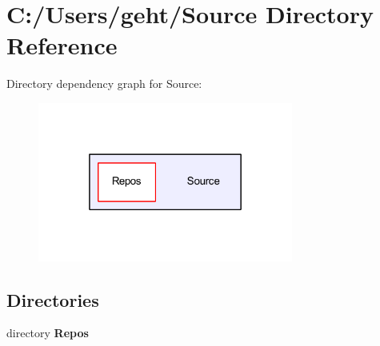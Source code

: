 \section{C\-:/\-Users/geht/\-Source Directory Reference}
\label{dir_74389ed8173ad57b461b9d623a1f3867}
Directory dependency graph for Source\-:
\nopagebreak
\begin{figure}[H]
\begin{center}
\leavevmode
\includegraphics[width=238pt]{dir_74389ed8173ad57b461b9d623a1f3867_dep}
\end{center}
\end{figure}
\subsection*{Directories}
\begin{DoxyCompactItemize}
\item 
directory {\bf Repos}
\end{DoxyCompactItemize}
